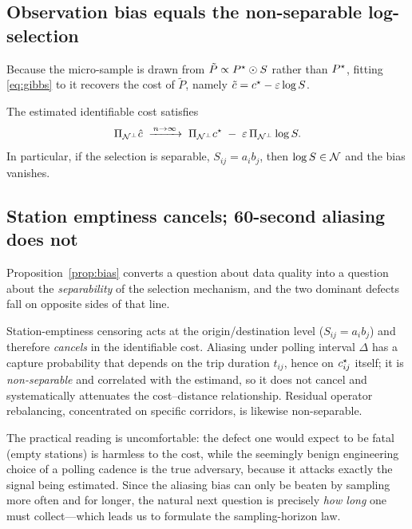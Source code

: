 \subsection{Observation bias equals the non-separable log-selection}
\label{sec:bias}

Because the micro-sample is drawn from $\tilde P\propto P^{\star}\odot S$ rather
than $P^{\star}$, fitting \eqref{eq:gibbs} to it recovers the cost of $\tilde P$,
namely $\tilde c = c^{\star} - \varepsilon\log S$.

\begin{proposition}[Bias = non-separable log-selection]
\label{prop:bias}
The estimated identifiable cost satisfies
\begin{equation}
\label{eq:bias}
\Pi_{\mathcal{N}^\perp}\hat c \;\xrightarrow{\,n\to\infty\,}\; \Pi_{\mathcal{N}^\perp}c^{\star}
\;-\;\varepsilon\,\Pi_{\mathcal{N}^\perp}\log S .
\end{equation}
In particular, if the selection is separable, $S_{ij}=a_i b_j$, then
$\log S\in\mathcal{N}$ and the bias vanishes. 
\end{proposition}

\subsection{Station emptiness cancels; 60-second aliasing does not}
\label{sec:aliasing}

Proposition~\ref{prop:bias} converts a question about data quality into a
question about the \emph{separability} of the selection mechanism, and the two
dominant defects fall on opposite sides of that line.

\begin{corollary}
\label{cor:aliasing}
Station-emptiness censoring acts at the origin/destination level
($S_{ij}=a_i b_j$) and therefore \emph{cancels} in the identifiable cost.
Aliasing under polling interval $\Delta$ has a capture probability that depends
on the trip duration $t_{ij}$, hence on $c^{\star}_{ij}$ itself; it is
\emph{non-separable} and correlated with the estimand, so it does not cancel and
systematically attenuates the cost--distance relationship. Residual operator
rebalancing, concentrated on specific corridors, is likewise non-separable.
\end{corollary}

The practical reading is uncomfortable: the defect one would expect to be fatal
(empty stations) is harmless to the cost, while the seemingly benign engineering
choice of a polling cadence is the true adversary, because it attacks exactly the
signal being estimated. Since the aliasing bias can only be beaten by sampling
more often and for longer, the natural next question is precisely \emph{how long}
one must collect---which leads us to formulate the sampling-horizon law.

